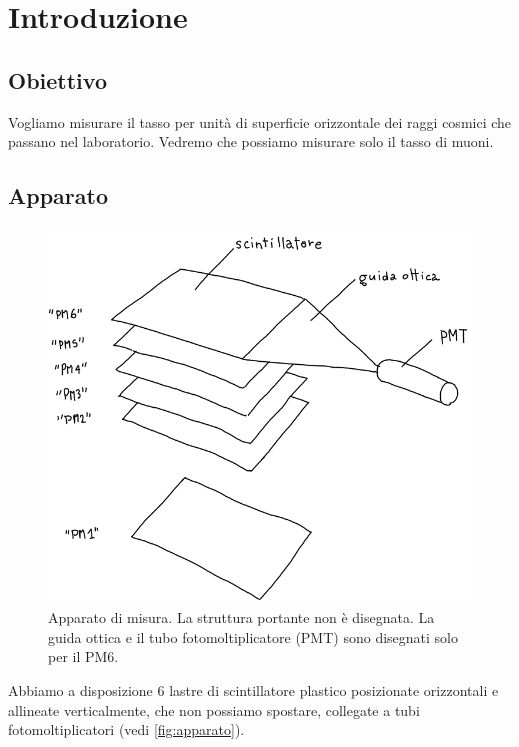 \section{Introduzione}

\subsection{Obiettivo}

Vogliamo misurare il tasso per unità di superficie orizzontale
dei raggi cosmici che passano nel laboratorio.
Vedremo che possiamo misurare solo il tasso di muoni.

\subsection{Apparato}
\begin{figure}[h]
	\center
	\includegraphics[width=\textwidth]{apparato}
	\caption{\label{fig:apparato}
	Apparato di misura.
	La struttura portante non è disegnata.
	La guida ottica e il tubo fotomoltiplicatore (PMT) sono disegnati solo per il PM6.}
\end{figure}

Abbiamo a disposizione 6 lastre di scintillatore plastico
posizionate orizzontali e allineate verticalmente,
che non possiamo spostare,
collegate a tubi fotomoltiplicatori (vedi \autoref{fig:apparato}).
